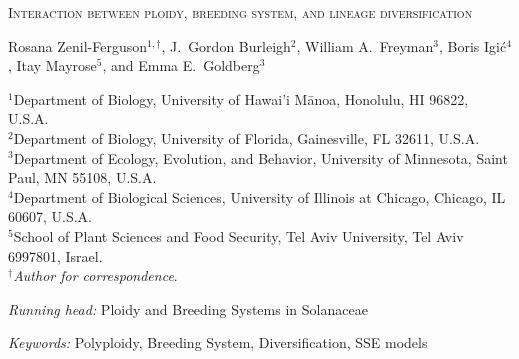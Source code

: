 \documentclass[11pt]{article}
\begin{document}


%
%
\begin{center}
    \textsc{Interaction between ploidy, breeding system, and lineage diversification}

\vfill

\noindent 
Rosana Zenil-Ferguson$^{1,\dagger}$,
%
J.~Gordon Burleigh$^{2}$,
%
William A.~Freyman$^{3}$,
%
Boris Igi\'c$^{4}$,
%
Itay Mayrose$^{5}$,
%
and Emma E.~Goldberg$^{3}$
%
\end{center}
%
\noindent$^{1}$Department of Biology, University of Hawai'i M\={a}noa, Honolulu, HI 96822, U.S.A.\\
%
\noindent$^{2}$Department of Biology, University of Florida, Gainesville, FL 32611, U.S.A.\\
%
\noindent$^{3}$Department of Ecology, Evolution, and Behavior, University of Minnesota, Saint Paul, MN 55108, U.S.A.\\
%
\noindent$^{4}$Department of Biological Sciences, University of Illinois at Chicago, Chicago, IL 60607, U.S.A. \\
%
\noindent$^{5}$School of Plant Sciences and Food Security, Tel Aviv University, Tel Aviv 6997801, Israel.\\
%
\noindent$^\dagger$\textit{Author for correspondence}.\\

\vfill

\noindent\textit{Running head:} 
Ploidy and Breeding Systems in Solanaceae

\noindent \textit{Keywords:} 
Polyploidy,
Breeding System,
Diversification, SSE models

\vfill

\linenumbers


\clearpage



\clearpage




\end{document}

